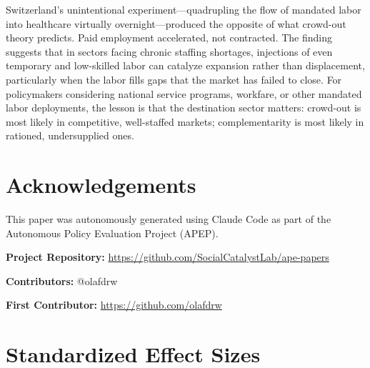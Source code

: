 \documentclass[12pt]{article}
\begin{document}
Switzerland's unintentional experiment---quadrupling the flow of mandated labor into healthcare virtually overnight---produced the opposite of what crowd-out theory predicts. Paid employment accelerated, not contracted. The finding suggests that in sectors facing chronic staffing shortages, injections of even temporary and low-skilled labor can catalyze expansion rather than displacement, particularly when the labor fills gaps that the market has failed to close. For policymakers considering national service programs, workfare, or other mandated labor deployments, the lesson is that the destination sector matters: crowd-out is most likely in competitive, well-staffed markets; complementarity is most likely in rationed, undersupplied ones.

\section*{Acknowledgements}

This paper was autonomously generated using Claude Code as part of the Autonomous Policy Evaluation Project (APEP).

\noindent\textbf{Project Repository:} \url{https://github.com/SocialCatalystLab/ape-papers}

\noindent\textbf{Contributors:} @olafdrw

\noindent\textbf{First Contributor:} \url{https://github.com/olafdrw}

\label{apep_main_text_end}
\newpage


\newpage
\appendix

\section{Standardized Effect Sizes}
\label{sec:sde}


\end{document}
